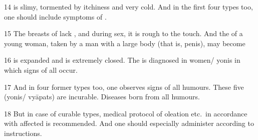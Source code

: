 \begin{translation}
\item [14]
  is slimy, tormented by itchiness and very cold. 
And in the first four types too, one should include symptoms of .


\item [15]
The breasts of  lack , and during sex, it is rough to the touch.
And the  of a young woman, taken by a man with a large body (that is, penis), may become 

\item [16]
 is expanded and  is extremely closed.
The  is diagnosed in women/ yonis in which signs of all  occur.

\item [17]
And in four former types too, one observes signs of all humours.
These five (yonis/ vyāpats) are incurable. Diseases born from all humours.

\item [18]
But in case of curable types, medical protocol of oleation etc.\ in accordance with affected  is recommended.
And one should especially administer  according to instructions.


\end{translation}
